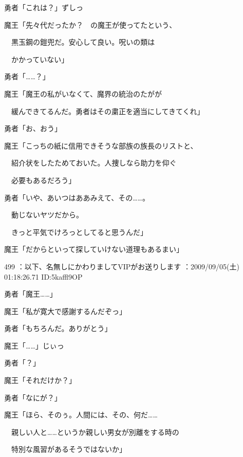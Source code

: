 \documentclass[a4j,twocolumn]{tarticle}
\begin{document}
勇者「これは？」ずしっ 



魔王「先々代だったか？　の魔王が使ってたという、\par{} 
　黒玉鋼の鎧兜だ。安心して良い。呪いの類は\par{} 
　かかっていない」 



勇者「……？」 



魔王「魔王の私がいなくて、魔界の統治のたがが\par{} 
　緩んできてるんだ。勇者はその粛正を適当にしてきてくれ」\par{} 
勇者「お、おう」 



魔王「こっちの紙に信用できそうな部族の族長のリストと、\par{} 
　紹介状をしたためておいた。人捜しなら助力を仰ぐ\par{} 
　必要もあるだろう」 



勇者「いや、あいつはああみえて、その……。\par{} 
　動じないヤツだから。\par{} 
　きっと平気でけろっとしてると思うんだ」 



魔王「だからといって探していけない道理もあるまい」 

	
    
    

499 ：以下、名無しにかわりましてVIPがお送りします ：2009/09/05(土) 01:18:26.71 ID:5kaffl9OP 


勇者「魔王……」\par{} 
魔王「私が寛大で感謝するんだぞっ」 



勇者「もちろんだ。ありがとう」 



魔王「……」じぃっ\par{} 
勇者「？」 



魔王「それだけか？」\par{} 
勇者「なにが？」 



魔王「ほら、そのぅ。人間には、その、何だ……\par{} 
　親しい人と……というか親しい男女が別離をする時の\par{} 
　特別な風習があるそうではないか」 
\end{document}
